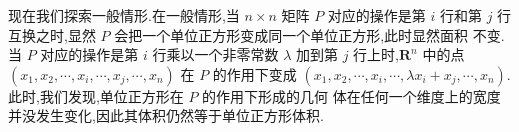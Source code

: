 \documentclass[a4paper, 12pt]{article} %
\begin{document}
现在我们探索一般情形.在一般情形,当 $n\times n$ 矩阵 $P$ 对应的操作是第
$i$ 行和第 $j$ 行互换之时,显然 $P$ 会把一个单位正方形变成同一个单位正方形,此时显然面积
不变.当 $P$ 对应的操作是第 $i$ 行乘以一个非零常数 $\lambda$ 加到第 $j$
行上时,$\mathbf{R}^n$ 中的点 $(x_1,x_2,\cdots,x_i,\cdots,x_j,\cdots,x_n)$
在 $P$ 的作用下变成 $(x_1,x_2,\cdots,x_i,\cdots,\lambda
x_i+x_j,\cdots,x_n)$.此时,我们发现,单位正方形在 $P$ 的作用下形成的几何
体在任何一个维度上的宽度并没发生变化,因此其体积仍然等于单位正方形体积.
  

  

  
\end{document}
